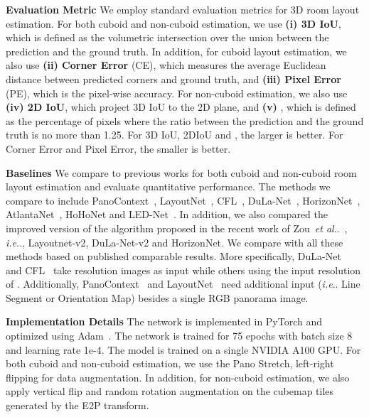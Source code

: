\documentclass[runningheads]{llncs}
\makeatletter
\DeclareRobustCommand\onedot{\futurelet\@let@token\@onedot}
\def\@onedot{\ifx\@let@token.\else.\null\fi\xspace}
\def\ie{\emph{i.e}\onedot} \def\Ie{\emph{I.e}\onedot}
\def\etal{\emph{et al}\onedot}
\makeatother
\begin{document}
\noindent\textbf{Evaluation Metric}
We employ standard evaluation metrics for 3D room layout estimation. For both cuboid and non-cuboid estimation, we use \textbf{(i) 3D IoU}, which is defined as the volumetric intersection over the union between the prediction and the ground truth. In addition, for cuboid layout estimation, we also use \textbf{(ii) Corner Error} (CE), which measures the average Euclidean distance between predicted corners and ground truth, and \textbf{(iii) Pixel Error} (PE), which is the pixel-wise accuracy. For non-cuboid estimation, we also use \textbf{(iv) 2D IoU}, which project 3D IoU to the 2D plane, and \textbf{(v) }, which is defined as the percentage of pixels where the ratio between the prediction and the ground truth is no more than 1.25. For 3D IoU, 2DIoU and , the larger is better. For Corner Error and Pixel Error, the smaller is better. 

\noindent\textbf{Baselines}
We compare to previous works for both cuboid and non-cuboid room layout estimation and evaluate quantitative performance.
The methods we compare to include PanoContext~\cite{zhang2014panocontext}, LayoutNet~\cite{zou2018layoutnet}, CFL~\cite{fernandez2020corners}, DuLa-Net~\cite{yang2019dula}, HorizonNet~\cite{sun2019horizonnet}, AtlantaNet~\cite{pintore2020atlantanet}, HoHoNet\cite{Sun_2021_HoHoNet} and LED-Net~\cite{Wang_2021_LED2Net}. 
In addition, we also compared the improved version of the algorithm proposed in the recent work of Zou~\etal~\cite{zou2021_layoutv2}, \ie, Layoutnet-v2, DuLa-Net-v2 and HorizonNet.
We compare with all these methods based on published comparable results.
More specifically, DuLa-Net~\cite{yang2019dula} and CFL~\cite{fernandez2020corners} take  resolution images as input while others using the input resolution of .
Additionally, PanoContext~\cite{zhang2014panocontext} and LayoutNet~\cite{zou2018layoutnet} need additional input (\ie Line Segment or Orientation Map) besides a single RGB panorama image.

\noindent\textbf{Implementation Details}\label{sec:implemention_details}
The network is implemented in PyTorch and optimized using Adam~\cite{kingma2014adam}. The network is trained for 75 epochs with batch size 8 and learning rate 1e-4.
The model is trained on a single NVIDIA A100 GPU. 
For both cuboid and non-cuboid estimation, we use the Pano Stretch\cite{sun2019horizonnet}, left-right flipping for data augmentation. In addition, for non-cuboid estimation, we also apply vertical flip and random  rotation augmentation on the cubemap tiles generated by the E2P transform.
\end{document}
